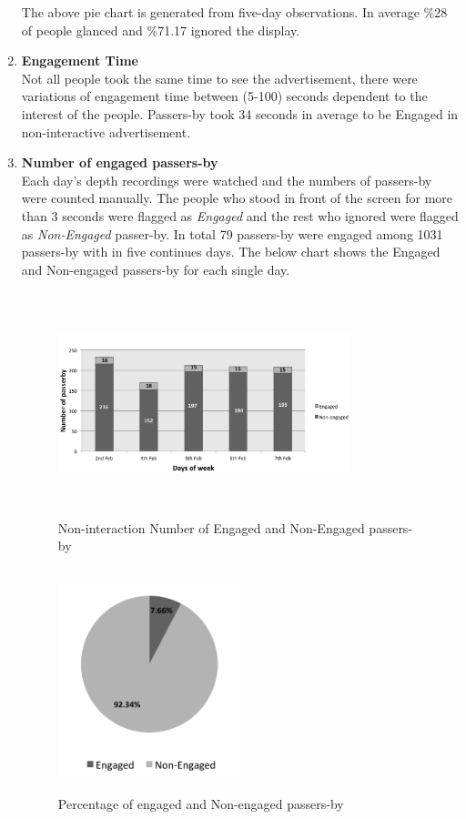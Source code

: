 \begin{enumerate}
The above pie chart is generated from five-day observations. In average \%28 of people glanced and \%71.17 ignored the display. 

\item \textbf{Engagement Time} \\
Not all people took the same time to see the advertisement, there were variations of engagement time between (5-100) seconds dependent to the interest of the people. Passers-by took 34 seconds in average to be Engaged in non-interactive advertisement.


\item \textbf{Number of engaged passers-by} \\
Each day’s depth recordings were watched and the numbers of passers-by were counted manually. The people who stood in front of the screen for more than 3 seconds were flagged as \emph{Engaged} and the rest who ignored were flagged as \emph{Non-Engaged} passer-by. In total 79 passers-by were engaged among 1031 passers-by with in five continues days. The below chart shows the Engaged and Non-engaged passers-by for each single day.


\begin{figure}[H]
    \centering
    \includegraphics[width=0.8\textwidth,height=6.5cm]{Figures/8/non_inter_findings/non_inter_engage_day}
    \caption{Non-interaction Number of Engaged and Non-Engaged passers-by}%
    \label{fig:Nonengagedandengagedby}%
\end{figure}

\begin{figure}[H]
    \centering
    \includegraphics[width=0.5\textwidth,height=6.5cm]{Figures/8/non_inter_findings/non_eng_percentage}
    \caption{Percentage of engaged and Non-engaged passers-by}%
    \label{fig:Nonengagedpasserbypercentage}%
\end{figure}



\end{enumerate}
